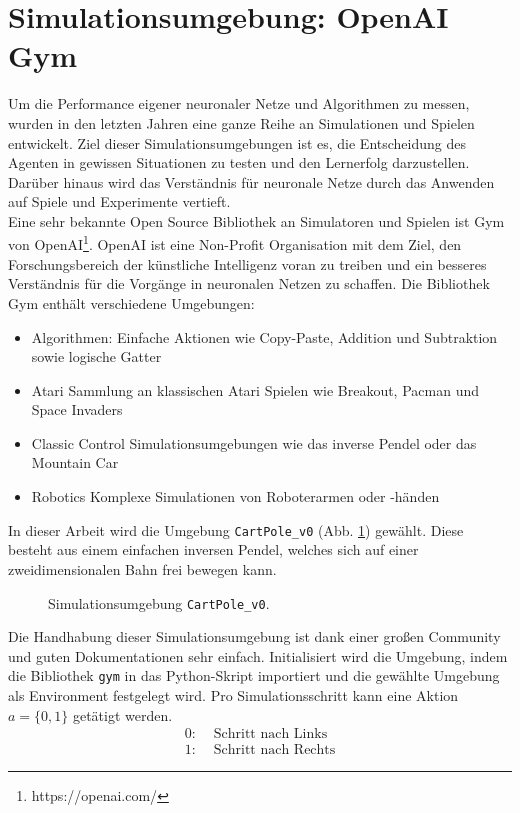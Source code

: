 \section{Simulationsumgebung: OpenAI Gym}
\label{sec:imp_sim}
	Um die Performance eigener neuronaler Netze und Algorithmen zu messen, wurden in den letzten Jahren eine ganze Reihe an Simulationen und Spielen entwickelt. Ziel dieser Simulationsumgebungen ist es, die Entscheidung des Agenten in gewissen Situationen zu testen und den Lernerfolg darzustellen. Darüber hinaus wird das Verständnis für neuronale Netze durch das Anwenden auf Spiele und Experimente vertieft.\\
	Eine sehr bekannte Open Source Bibliothek an Simulatoren und Spielen ist Gym von OpenAI\footnote{https://openai.com/}. OpenAI ist eine Non-Profit Organisation mit dem Ziel, den Forschungsbereich der künstliche Intelligenz voran zu treiben und ein besseres Verständnis für die Vorgänge in neuronalen Netzen zu schaffen. Die Bibliothek Gym enthält verschiedene Umgebungen:
	\begin{itemize}
		\item Algorithmen:
		\subitem Einfache Aktionen wie Copy-Paste, Addition und Subtraktion sowie logische Gatter
		\item Atari
		\subitem Sammlung an klassischen Atari Spielen wie Breakout, Pacman und Space Invaders
		\item Classic Control
		\subitem Simulationsumgebungen wie das inverse Pendel oder das Mountain Car
		\item Robotics
		\subitem Komplexe Simulationen von Roboterarmen oder -händen
	\end{itemize}
	In dieser Arbeit wird die Umgebung \texttt{CartPole\_v0} (Abb. \ref{fig:imp_cartpole}) gewählt. Diese besteht aus einem einfachen inversen Pendel, welches sich auf einer zweidimensionalen Bahn frei bewegen kann.
	\begin{figure}[!h] %
		\centering
		\def\svgwidth{12cm}
		
		\caption{Simulationsumgebung \texttt{CartPole\_v0}.}
		\label{fig:imp_cartpole}
	\end{figure}
	Die Handhabung dieser Simulationsumgebung ist dank einer großen Community und guten Dokumentationen sehr einfach. Initialisiert wird die Umgebung, indem die Bibliothek \texttt{gym} in das Python-Skript importiert und die gewählte Umgebung als \glqq Environment \grqq{}festgelegt wird. Pro Simulationsschritt kann eine Aktion $a = \{0,1\}$ getätigt werden.
	\begin{align*}
		0 :& \text{ Schritt nach Links}\\
		1 :& \text{ Schritt nach Rechts}
	\end{align*}
